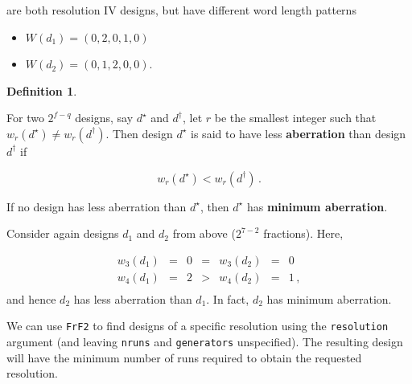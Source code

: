 \documentclass[
]{book}
\newenvironment{Shaded}{\begin{snugshade}}{\end{snugshade}}
\newcommand{\AttributeTok}[1]{\textcolor[rgb]{0.77,0.63,0.00}{#1}}
\newcommand{\DecValTok}[1]{\textcolor[rgb]{0.00,0.00,0.81}{#1}}
\newcommand{\FloatTok}[1]{\textcolor[rgb]{0.00,0.00,0.81}{#1}}
\newcommand{\FunctionTok}[1]{\textcolor[rgb]{0.00,0.00,0.00}{#1}}
\newcommand{\NormalTok}[1]{#1}
\newcommand{\OtherTok}[1]{\textcolor[rgb]{0.56,0.35,0.01}{#1}}
\newcommand{\SpecialCharTok}[1]{\textcolor[rgb]{0.00,0.00,0.00}{#1}}
\providecommand{\tightlist}{%
  \setlength{\itemsep}{0pt}\setlength{\parskip}{0pt}}
\theoremstyle{definition}
\newtheorem{definition}{Definition}[chapter]
\theoremstyle{definition}
\theoremstyle{definition}
\theoremstyle{definition}
\theoremstyle{remark}
\begin{document}
are both resolution IV designs, but have different word length patterns

\begin{itemize}
\tightlist
\item
  \(W(d_1) = (0, 2, 0, 1, 0)\)
\item
  \(W(d_2) = (0, 1, 2, 0, 0)\).
\end{itemize}

\begin{definition}
\protect\hypertarget{def:minab}{}\label{def:minab}

For two \(2^{f-q}\) designs, say \(d^\star\) and \(d^\dagger\), let \(r\) be the smallest integer such that \(w_r(d^\star) \ne w_r(d^\dagger)\). Then design \(d^\star\) is said to have less \textbf{aberration} than design \(d^\dagger\) if

\[
w_r(d^\star) < w_r(d^\dagger)\,.
\]

If no design has less aberration than \(d^\star\), then \(d^\star\) has \textbf{minimum aberration}.

\end{definition}

Consider again designs \(d_1\) and \(d_2\) from above (\(2^{7-2}\) fractions). Here,

\[
\begin{array}{ccccccc}
w_3(d_1) & = & 0 & = & w_3(d_2) & = & 0 \\
w_4(d_1) & = & 2 & > & w_4(d_2) & = & 1 \,, \\
\end{array}
\]
and hence \(d_2\) has less aberration than \(d_1\). In fact, \(d_2\) has minimum aberration.

We can use \texttt{FrF2} to find designs of a specific resolution using the \texttt{resolution} argument (and leaving \texttt{nruns} and \texttt{generators} unspecified). The resulting design will have the minimum number of runs required to obtain the requested resolution.

\begin{Shaded}
\end{Shaded}
\end{document}
